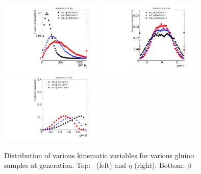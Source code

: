 \begin{figure}
 \begin{center}
  \includegraphics[clip=true, trim=0.0cm 0cm 1.4cm 0cm, width=0.44\textwidth]{figures/muonly/Selection_Comp_Gluino_genpT}
  \includegraphics[clip=true, trim=0.0cm 0cm 1.4cm 0cm, width=0.44\textwidth]{figures/muonly/Selection_Comp_Gluino_geneta}
  \includegraphics[clip=true, trim=0.0cm 0cm 1.4cm 0cm, width=0.44\textwidth]{figures/muonly/Selection_Comp_Gluino_genbeta}
 \end{center}
 \caption[Distribution of \pt, $\eta$, and $\beta$ for various gluino samples at generation]
{Distribution of various kinematic variables for various gluino samples at generation.
Top: \pt\ (left) and $\eta$ (right).
Bottom: $\beta$
   \label{fig:GenGluino}}
\end{figure}

